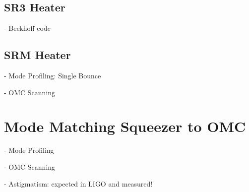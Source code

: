 	\subsection{SR3 Heater}
	- Beckhoff code
	
	\subsection{SRM Heater}
	- Mode Profiling: Single Bounce
	
	- OMC Scanning

\section{Mode Matching Squeezer to OMC}
	- Mode Profiling
	
	- OMC Scanning
	
	- Astigmatism: expected in LIGO and measured!